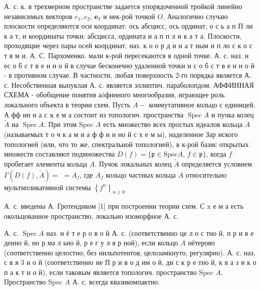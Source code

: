\documentclass[10pt]{article}
\begin{document}
А. с. к. в трехмерном пространстве задается упорядоченной тройкой линейно независимых векторов $e_{1}, e_{2}$, $\boldsymbol{e}_{3}$ и нек-рой точкой $O$. Аналогично случаю плоскости определяются оси координат: ось абсцисс, ось ординат, о с ь а п П ли к а т, и координаты точки: абсцисса, ордината и а п п л и к а т а. Плоскости, проходящие через пары осей координат, наз. к о о р д и н а т ным и п ло с к о с т я м и. А. С. Пархоменко. мали к-рой пересекаются в одной точке. А. с. наз. н ес о б с т в е н н о й в случае бесконечно удаленной точки и с о б с т в е н н о й - в противном случае. В частности, любая поверхность 2-го порядка является А. с. Несобственная выпуклая А. с. является эллиптич. параболопдом. АФФИННАЯ СХЕМА - обобщение понятия аø̆финного многообразия, играющее роль локального объекта в теории схем. Пусть $A-$ коммутативное кольцо с единицей. А фф ин н а с $\mathbf{x}$ е м а состоит из топологич. пространства $\operatorname{Spec} A$ и пучка колец $\tilde{A}$ на $\operatorname{Spec} A$. При этом Spec $A$ есть множество всех простых идеалов кольца $A$ (называемых т о ч к а м и а ф ф и н но й с х е м ы), наделенное Зар иского топологией (или, что то же, спектральной топологией), в к-рой базис открытых множеств составляют подмножества $D(f)=\{\mathfrak{p} \in \mathrm{Spec} A$, $f \in \mathfrak{p}\}$, когда $f$ пробегает әлементы кольца $A$. Пучок локальных колец $\tilde{A}$ определяется условием $\Gamma(D(f), \tilde{A})=$ $=A_{f}$, где $A_{f}$ кольцо частных кольца $A$ относительно мультипликативной системы $\left\{f^{n}\right\}_{n \geqslant 0}$



А. с. введены А. Гротендиком [1] при построении теории схем. С $\mathrm{x}$ е м а есть окольцованное пространство, локально изоморфное А. с.



А. с. $\operatorname{Spec} A$ наз. н ё т е р о в о й А. с. (соответственно це л о с тно й, п р и в е денно й, но р ма л ьно й, р е г у л я р ной), если кольцо $A$ нётерово (соответственно целостно, без нильпотентов, целозамкнуто, регулярно). А. с. наз. с в я 3 н о й (соответственно не П р и в о д им о й, ди с к р е тно й, к в а з и к о п а к т н о й), если таковым является топологич. пространство Spec $A$. Пространство Spec $A$ А. с. всегда квазикомпактно.
\end{document}
